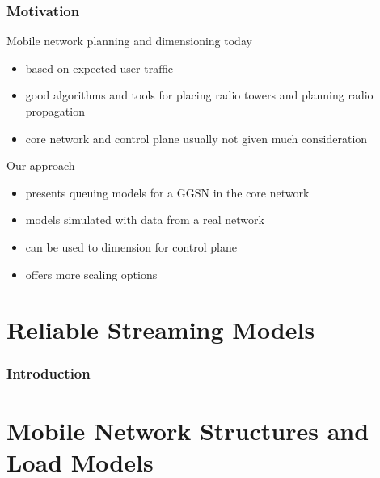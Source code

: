 \documentclass{beamer}
\begin{document}
\begin{frame}
    \frametitle{Motivation}



	Mobile network planning and dimensioning today
    \begin{itemize}
    	\item based on expected user traffic
		\item good algorithms and tools for placing radio towers and planning radio propagation
		\item core network and control plane usually not given much consideration
	\end{itemize}

	Our approach
	\begin{itemize}
		\item presents queuing models for a GGSN in the core network
		\item models simulated with data from a real network
		\item can be used to dimension for control plane
		\item offers more scaling options
	\end{itemize}

\end{frame}



\section{Reliable Streaming Models}

\begin{frame}
	\frametitle{Introduction}
\end{frame}



\section{Mobile Network Structures and Load Models}
\end{document}
